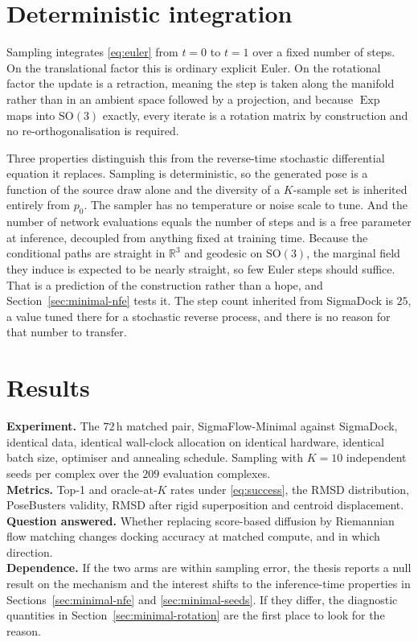 \documentclass[11pt,a4paper]{report}
\theoremstyle{plain}
\theoremstyle{definition}
\theoremstyle{remark}
\newenvironment{reserved}[1]{%
    \begin{tcolorbox}[
      enhanced, breakable,
      colback=PanelGrey, colframe=DraftBlue,
      boxrule=0.5pt, left=6pt,right=6pt,top=5pt,bottom=5pt,
      fonttitle=\bfseries\small\sffamily,
      title={RESERVED \textendash\ #1}]
      \small\sffamily
  }{%
    \end{tcolorbox}
  }
\newenvironment{reserved}[1]{\setbox0=\vbox\bgroup}{\egroup}
\newcommand{\R}{\mathbb{R}}
\newcommand{\SOthree}{\mathrm{SO}(3)}
\newcommand{\Exp}{\operatorname{Exp}}
\begin{document}
\section{Deterministic integration}
\label{sec:integration}

Sampling integrates \eqref{eq:euler} from $t=0$ to $t=1$ over a fixed number of
steps. On the translational factor this is ordinary explicit Euler. On the
rotational factor the update is a retraction, meaning the step is taken along
the manifold rather than in an ambient space followed by a projection, and
because $\Exp$ maps into $\SOthree$ exactly, every iterate is a rotation matrix
by construction and no re-orthogonalisation is required.

Three properties distinguish this from the reverse-time stochastic differential
equation it replaces. Sampling is deterministic, so the generated pose is a
function of the source draw alone and the diversity of a $K$-sample set is
inherited entirely from $p_0$. The sampler has no temperature or noise scale to
tune. And the number of network evaluations equals the number of steps and is a
free parameter at inference, decoupled from anything fixed at training time.
Because the conditional paths are straight in $\R^3$ and geodesic on
$\SOthree$, the marginal field they induce is expected to be nearly straight,
so few Euler steps should suffice. That is a prediction of the construction
rather than a hope, and Section~\ref{sec:minimal-nfe} tests it. The step count
inherited from SigmaDock is $25$, a value tuned there for a stochastic reverse
process, and there is no reason for that number to transfer.

\section{Results}
\label{sec:minimal-results}

\begin{reserved}{SigmaFlow-Minimal against SigmaDock at matched budget}
\textbf{Experiment.} The $72$\,h matched pair, SigmaFlow-Minimal against
SigmaDock, identical data, identical wall-clock allocation on identical
hardware, identical batch size, optimiser and annealing schedule. Sampling with
$K=10$ independent seeds per complex over the $209$ evaluation complexes.\\
\textbf{Metrics.} Top-1 and oracle-at-$K$ rates under \eqref{eq:success}, the
RMSD distribution, PoseBusters validity, RMSD after rigid superposition and
centroid displacement.\\
\textbf{Question answered.} Whether replacing score-based diffusion by
Riemannian flow matching changes docking accuracy at matched compute, and in
which direction.\\
\textbf{Dependence.} If the two arms are within sampling error, the thesis
reports a null result on the mechanism and the interest shifts to the
inference-time properties in Sections~\ref{sec:minimal-nfe} and
\ref{sec:minimal-seeds}. If they differ, the diagnostic quantities in
Section~\ref{sec:minimal-rotation} are the first place to look for the reason.
\end{reserved}
\end{document}
